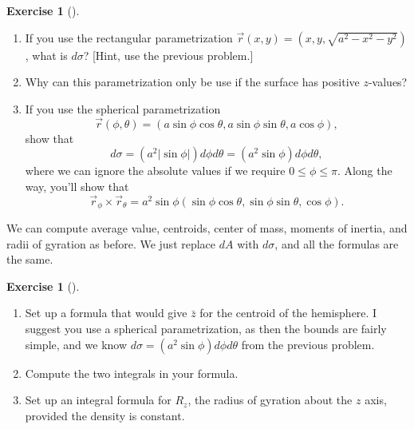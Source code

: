 \documentclass[10pt,]{book}
\theoremstyle{plain}
\theoremstyle{definition}
\theoremstyle{definition}
\theoremstyle{definition}
\theoremstyle{definition}
\newtheorem{exploration}[project]{Exercise}
\theoremstyle{definition}
\numberwithin{equation}{section}
\begin{document}
\begin{exploration}[]\label{sphere_surface_area_element}
\leavevmode%
\begin{enumerate}[font=\bfseries,label=(\alph*),ref=\alph*]
\item\label{task-760} If you use the rectangular parametrization \(\vec r(x,y) = (x,y,\sqrt{a^2-x^2-y^2})\), what is \(d\sigma\)? [Hint, use the previous problem.]%
\item\label{task-761} Why can this parametrization only be use if the surface has positive \(z\)-values?%
\item\label{task-762} If you use the spherical parametrization%
\begin{equation*}
\vec r(\phi,\theta) = (a\sin\phi\cos\theta,a\sin\phi\sin\theta,a\cos\phi),
\end{equation*}
show that%
\begin{equation*}
d\sigma = (a^2|\sin\phi|)d\phi d\theta= (a^2\sin\phi) d\phi d\theta,
\end{equation*}
where we can ignore the absolute values if we require \(0\leq \phi\leq \pi\). Along the way, you'll show that%
\begin{equation*}
\vec r_\phi\times \vec r_\theta = a^2\sin \phi (\sin\phi\cos\theta,\sin\phi\sin\theta,\cos\phi).
\end{equation*}
%
\end{enumerate}
\end{exploration}
We can compute average value, centroids, center of mass, moments of inertia, and radii of gyration as before. We just replace \(dA\) with \(d\sigma\), and all the formulas are the same.%
\begin{exploration}[]\label{exploration-281}
\leavevmode%
\begin{enumerate}[font=\bfseries,label=(\alph*),ref=\alph*]
\item\label{task-763} Set up a formula that would give \(\bar z\) for the centroid of the hemisphere. I suggest you use a spherical parametrization, as then the bounds are fairly simple, and we know \(d\sigma = (a^2\sin\phi) d\phi d\theta\) from the previous problem.%
\item\label{task-764} Compute the two integrals in your formula.%
\item\label{task-765} Set up an integral formula for \(R_z\), the radius of gyration about the \(z\) axis, provided the density is constant.%
\end{enumerate}
\end{exploration}
\typeout{************************************************}
\typeout{************************************************}
\end{document}
